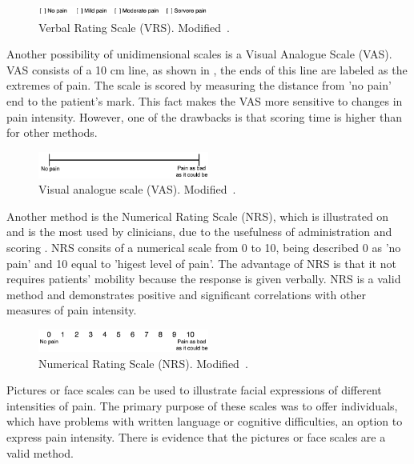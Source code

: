 \begin{figure}[H]
	\includegraphics[width=0.5\textwidth]{figures/VRS.png} 
	\caption{Verbal Rating Scale (VRS). Modified~\cite{Jensen2001}.}
	\label{fig:VRS}  
\end{figure}   

Another possibility of unidimensional scales is a Visual Analogue Scale (VAS). VAS consists of a 10 cm line, as shown in , the ends of this line are labeled as the extremes of pain. The scale is scored by measuring the distance from 'no pain' end to the patient's mark. This fact makes the VAS more sensitive to changes in pain intensity. However, one of the drawbacks is that scoring time is higher than for other methods.~\cite{Jensen2001} 

\begin{figure}[H]
	\includegraphics[width=0.5\textwidth]{figures/VAS.png} 
	\caption{Visual analogue scale (VAS). Modified~\cite{Jensen2001}.}
	\label{fig:VAS}  
\end{figure}   

Another method is the Numerical Rating Scale (NRS), which is illustrated on  and is the most used by clinicians, due to the usefulness of administration and scoring  \cite{Fillingim2016}. NRS consits of a numerical scale from 0 to 10, being described 0 as 'no pain' and  10 equal to 'higest level of pain'. The advantage of NRS is that it not requires patients' mobility because the response is given verbally. NRS is a valid method and demonstrates positive and significant correlations with other measures of pain intensity. \cite{Jensen2001} 

\begin{figure}[H]
	\includegraphics[width=0.5\textwidth]{figures/NRS.png} 
	\caption{Numerical Rating Scale (NRS). Modified~\cite{Jensen2001}.}
	\label{fig:NRS}  
\end{figure}   

Pictures or face scales can be used to illustrate facial expressions of different intensities of pain. The primary purpose of these scales was to offer individuals, which have problems with written language or cognitive difficulties, an option to express pain intensity. There is evidence that the pictures or face scales are a valid method. \cite{Jensen2001} 


